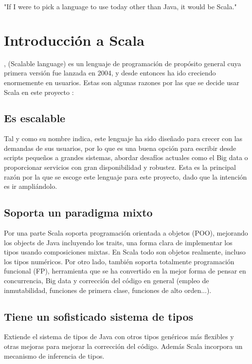 
\begin{savequote}[75mm]
"If I were to pick a language to use today other than Java, it would be Scala."
\end{savequote}

\chapter{Introducción a Scala}
, (Scalable language) es un lenguaje de programación de propósito general cuya primera versión fue lanzada en 2004, y desde entonces ha ido creciendo enormemente en usuarios. Estas son algunas razones por las que se decide usar Scala en este proyecto \citet{9781491949856}:
\section*{Es escalable} Tal y como su nombre indica, este lenguaje ha sido diseñado para crecer con las demandas de sus usuarios, por lo que es una buena opción para escribir desde scripts pequeños a grandes sistemas, abordar desafíos actuales como el Big data o proporcionar servicios con gran disponibilidad y robustez. Esta es la principal razón por la que se escoge este lenguaje para este proyecto, dado que la intención es ir ampliándolo.

\section*{Soporta un paradigma mixto} Por una parte \textsf{Scala} soporta programación orientada a objetos (POO), mejorando los objects de Java incluyendo los \textsf{traits}, una forma clara de implementar los tipos usando composiciones mixtas. En \textsf{Scala} todo son objetos realmente, incluso los tipos numéricos. Por otro lado, también soporta totalmente programación funcional (FP),
herramienta que se ha convertido en la mejor forma de pensar en concurrencia, Big data y corrección del código en general (empleo de inmutabilidad, funciones de primera clase, funciones de alto orden...). 

\section*{Tiene un sofisticado sistema de tipos} Extiende el sistema de tipos de Java con otros tipos genéricos más flexibles y otras mejoras para mejorar la corrección del código. Además \textsf{Scala} incorpora un mecanismo de inferencia de tipos.
